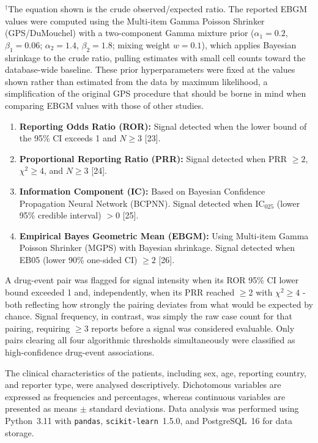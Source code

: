 \documentclass[10pt,a4paper]{article}
\begin{document}
\noindent$^{\dagger}$The equation shown is the crude observed/expected ratio. The reported EBGM values were computed using the Multi-item Gamma Poisson Shrinker (GPS/DuMouchel) with a two-component Gamma mixture prior ($\alpha_1=0.2$, $\beta_1=0.06$; $\alpha_2=1.4$, $\beta_2=1.8$; mixing weight $w=0.1$), which applies 
Bayesian shrinkage to the crude ratio, pulling estimates with small cell counts toward the database-wide 
baseline. These prior hyperparameters were fixed at the values shown rather than estimated from the data by 
maximum likelihood, a simplification of the original GPS procedure that should be borne in mind when 
comparing EBGM values with those of other studies.


\begin{enumerate}[noitemsep]
\item \textbf{Reporting Odds Ratio (ROR):} Signal detected when the lower bound of the 95\% CI exceeds 1 and $N \geq 3$ [23].
\item \textbf{Proportional Reporting Ratio (PRR):} Signal detected when PRR $\geq 2$, $\chi^2 \geq 4$, and $N \geq 3$ [24].
\item \textbf{Information Component (IC):} Based on Bayesian Confidence Propagation Neural Network (BCPNN). Signal detected when IC$_{025}$ (lower 95\% credible interval) $> 0$ [25].
\item \textbf{Empirical Bayes Geometric Mean (EBGM):} Using Multi-item Gamma Poisson Shrinker (MGPS) with Bayesian shrinkage. Signal detected when EB05 (lower 90\% one-sided CI) $\geq 2$ [26].
\end{enumerate}

A drug-event pair was flagged for signal intensity when its ROR 95\% CI lower bound exceeded 1 and, independently, when its PRR reached $\geq$2 with $\chi^2 \geq 4$ - both reflecting how strongly the pairing deviates from what would be expected by chance. Signal frequency, in contrast, was simply the raw case count for that pairing, requiring $\geq$3 reports before a signal was considered evaluable. Only pairs clearing all four algorithmic thresholds simultaneously were classified as high-confidence drug-event associations.

The clinical characteristics of the patients, including sex, age, reporting country, and reporter type, were analysed descriptively. Dichotomous variables are expressed as frequencies and percentages, whereas continuous variables are presented as means $\pm$ standard deviations. Data analysis was performed using Python~3.11 with \texttt{pandas}, \texttt{scikit-learn}~1.5.0, and PostgreSQL~16 for data storage.
\end{document}
